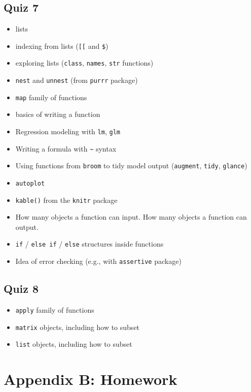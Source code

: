 \documentclass[]{book}
\providecommand{\tightlist}{%
  \setlength{\itemsep}{0pt}\setlength{\parskip}{0pt}}
\theoremstyle{definition}
\theoremstyle{definition}
\theoremstyle{definition}
\theoremstyle{remark}
\begin{document}
\section{Quiz 7}\label{quiz-7}

\begin{itemize}
\tightlist
\item
  lists
\item
  indexing from lists (\texttt{{[}{[}} and \texttt{\$})
\item
  exploring lists (\texttt{class}, \texttt{names}, \texttt{str}
  functions)
\item
  \texttt{nest} and \texttt{unnest} (from \texttt{purrr} package)
\item
  \texttt{map} family of functions
\item
  basics of writing a function
\item
  Regression modeling with \texttt{lm}, \texttt{glm}
\item
  Writing a formula with \texttt{\textasciitilde{}} syntax
\item
  Using functions from \texttt{broom} to tidy model output
  (\texttt{augment}, \texttt{tidy}, \texttt{glance})
\item
  \texttt{autoplot}
\item
  \texttt{kable()} from the \texttt{knitr} package
\item
  How many objects a function can input. How many objects a function can
  output.
\item
  \texttt{if} / \texttt{else\ if} / \texttt{else} structures inside
  functions
\item
  Idea of error checking (e.g., with \texttt{assertive} package)
\end{itemize}

\section{Quiz 8}\label{quiz-8}

\begin{itemize}
\tightlist
\item
  \texttt{apply} family of functions
\item
  \texttt{matrix} objects, including how to subset
\item
  \texttt{list} objects, including how to subset
\end{itemize}

\chapter{Appendix B: Homework}\label{appendix-b-homework}
\end{document}
